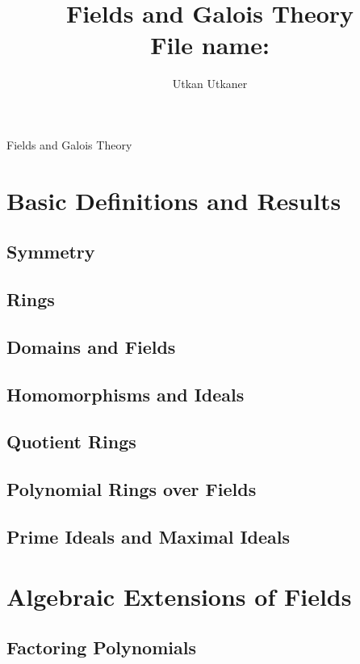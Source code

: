 \documentclass[draft]{article}
\title{Fields and Galois Theory\\
File name: \fn{ktt.tex}}
\author{Utkan Utkaner}
\theoremstyle{definition}
\theoremstyle{remark}
\begin{document}
	\maketitle
	{Fields and Galois Theory}
	\renewcommand{\sectionmark}[1]{}
	
	\section{Basic Definitions and Results}
		
        \subsection{Symmetry}
		
        \subsection{Rings}
		
        \subsection{Domains and Fields}
		
        \subsection{Homomorphisms and Ideals}
		
        \subsection{Quotient Rings}
		
        \subsection{Polynomial Rings over Fields}
		
        \subsection{Prime Ideals and Maximal Ideals}
		    
	\section{Algebraic Extensions of Fields}
	
		\subsection{Factoring Polynomials}
		
\end{document}
